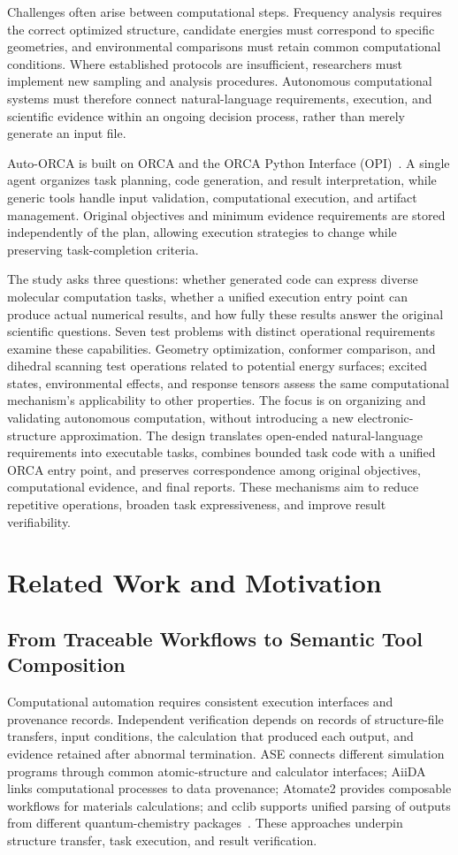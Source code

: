 \documentclass[a4paper,11pt]{article}
\begin{document}
Challenges often arise between computational steps.
Frequency analysis requires the correct optimized structure, candidate energies must correspond to specific geometries, and environmental comparisons must retain common computational conditions.
Where established protocols are insufficient, researchers must implement new sampling and analysis procedures.
Autonomous computational systems must therefore connect natural-language requirements, execution, and scientific evidence within an ongoing decision process, rather than merely generate an input file.

Auto-ORCA is built on ORCA and the ORCA Python Interface (OPI)~\cite{orca2020,orca6,opipaper}.
A single agent organizes task planning, code generation, and result interpretation, while generic tools handle input validation, computational execution, and artifact management.
Original objectives and minimum evidence requirements are stored independently of the plan, allowing execution strategies to change while preserving task-completion criteria.

The study asks three questions: whether generated code can express diverse molecular computation tasks, whether a unified execution entry point can produce actual numerical results, and how fully these results answer the original scientific questions.
Seven test problems with distinct operational requirements examine these capabilities.
Geometry optimization, conformer comparison, and dihedral scanning test operations related to potential energy surfaces; excited states, environmental effects, and response tensors assess the same computational mechanism's applicability to other properties.
The focus is on organizing and validating autonomous computation, without introducing a new electronic-structure approximation.
The design translates open-ended natural-language requirements into executable tasks, combines bounded task code with a unified ORCA entry point, and preserves correspondence among original objectives, computational evidence, and final reports.
These mechanisms aim to reduce repetitive operations, broaden task expressiveness, and improve result verifiability.

\section{Related Work and Motivation}
\subsection{From Traceable Workflows to Semantic Tool Composition}
Computational automation requires consistent execution interfaces and provenance records.
Independent verification depends on records of structure-file transfers, input conditions, the calculation that produced each output, and evidence retained after abnormal termination.
ASE connects different simulation programs through common atomic-structure and calculator interfaces; AiiDA links computational processes to data provenance; Atomate2 provides composable workflows for materials calculations; and cclib supports unified parsing of outputs from different quantum-chemistry packages~\cite{ase,aiida,atomate2,cclib}.
These approaches underpin structure transfer, task execution, and result verification.
\end{document}
